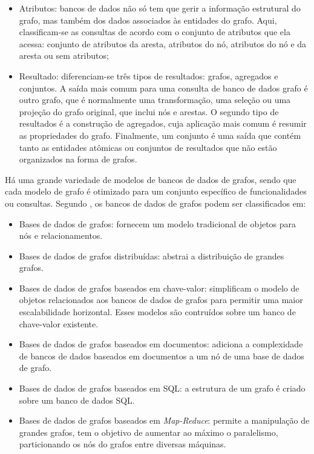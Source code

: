 \begin{itemize}
\item Atributos: bancos de dados não só tem que gerir a informação estrutural do grafo, mas também dos dados associados às entidades do grafo. Aqui, classificam-se as consultas de acordo com o conjunto de atributos que ela acessa: conjunto de atributos da aresta, atributos do nó, atributos do nó e da aresta ou sem atributos;
\item Resultado: diferenciam-se três tipos de resultados: grafos, agregados e conjuntos. A saída mais comum para uma consulta de banco de dados grafo é outro grafo, que é normalmente uma transformação, uma seleção ou uma projeção do grafo original, que inclui nós e arestas. O segundo tipo de resultados é a construção de agregados, cuja aplicação mais comum é resumir as propriedades do grafo. Finalmente, um conjunto é uma saída que contém tanto as entidades atômicas ou conjuntos de resultados que não estão organizados na forma de grafos.
\end{itemize}

Há uma grande variedade de modelos de bancos de dados de grafos, sendo que cada modelo de grafo é otimizado para um conjunto específico de funcionalidades ou consultas. Segundo \cite{buerli}, os bancos de dados de grafos podem ser classificados em:
\begin{itemize}
\item Bases de dados de grafos: fornecem um modelo tradicional de objetos para nós e relacionamentos.
\item Bases de dados de grafos distribuídas: abstrai a distribuição de grandes grafos.
\item Bases de dados de grafos baseados em chave-valor: simplificam o modelo de objetos relacionados aos bancos de dados de grafos para permitir uma maior escalabilidade horizontal. Esses modelos são contruídos sobre um banco de chave-valor existente.
\item Bases de dados de grafos baseados em documentos: adiciona a complexidade de bancos de dados baseados em documentos a um nó de uma base de dados de grafo.
\item Bases de dados de grafos baseados em SQL: a estrutura de um grafo é criado sobre um banco de dados SQL.
\item Bases de dados de grafos baseados em \textit{Map-Reduce}: permite a manipulação de grandes grafos, tem o objetivo de aumentar ao máximo o paralelismo, particionando os nós do grafos entre diversas máquinas.
\end{itemize}

